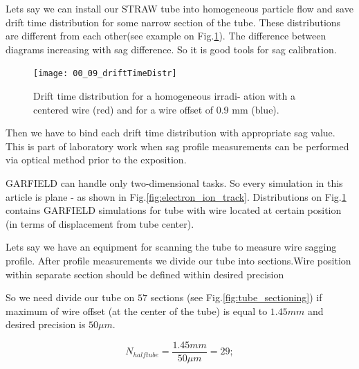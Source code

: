 	Lets say we can install our STRAW tube into homogeneous particle flow and save drift time distribution for some narrow section of the tube. These distributions are different from each other(see example on Fig.\ref{fig:DrftTimeDistr_00_09_comp}). The difference between diagrams increasing with sag difference. So it is good tools for sag calibration.
		
	\begin{figure}[h!]
	\centering
	\texttt{[image: 00\_09\_driftTimeDistr]}
	\caption{Drift time distribution for a homogeneous irradi-
ation with a centered wire (red) and for a wire offset of 0.9 mm (blue).}
	\label{fig:DrftTimeDistr_00_09_comp}	
	\end{figure}
	
	Then we have to bind each drift time distribution with appropriate sag value. This is part of laboratory work when sag profile measurements can be performed via optical method prior to the exposition.
	
	GARFIELD can handle only two-dimensional tasks. So every simulation in this article is plane - as shown in Fig.\ref{fig:electron_ion_track}.
	Distributions on Fig.\ref{fig:DrftTimeDistr_00_09_comp} contains GARFIELD simulations for tube with wire located at certain position (in terms of displacement from tube center).
	
	Lets say we have an equipment for scanning the tube to measure wire sagging profile. After profile measurements we divide our tube into sections.Wire position within separate section should be defined within desired precision
	
	So we need divide our tube on $57$ sections (see Fig.\ref{fig:tube_sectioning}) if maximum of wire offset (at the center of the tube) is equal to $1.45mm$ and desired precision is $50\mu m$.
	
	\begin{equation}
	N_{halftube} = \frac{1.45 mm}{50 \mu m} = 29;
	\label{eq:tube_sectioning}
	\end{equation}
	
